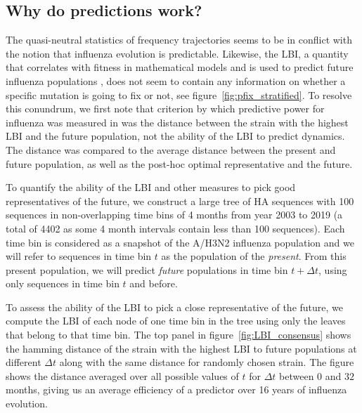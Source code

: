 \documentclass[reprint,amsmath,amssymb,superscriptaddress,showpacs,pre]{revtex4-1}
\begin{document}
\subsection*{Why do predictions work?}
The quasi-neutral statistics of frequency trajectories seems to be in conflict with the notion that influenza evolution is predictable.
Likewise, the LBI, a quantity that correlates with fitness in mathematical models and is used to predict future influenza populations \citep{neher_predicting_2014}, does not seem to contain any information on whether a specific mutation is going to fix or not, see figure~\ref{fig:pfix_stratified}. 
To resolve this conundrum, we first note that criterion by which predictive power for influenza was measured in \citep{neher_predicting_2014} was the distance between the strain with the highest LBI and the future population, not the ability of the LBI to predict dynamics.
The distance was compared to the average distance between the present and future population, as well as the post-hoc optimal representative and the future. 

To quantify the ability of the LBI and other measures to pick good representatives of the future, we construct a large tree of HA sequences with 100 sequences in non-overlapping time bins of 4 months from year 2003 to 2019 (a total of 4402 as some 4 month intervals contain less than 100 sequences).
Each time bin is considered as a snapshot of the A/H3N2 influenza population and we will refer to sequences in time bin $t$ as the population of the \emph{present}. 
From this present population, we will predict \emph{future} populations in time bin $t+\Delta t$, using only sequences in time bin $t$ and before. 

To assess the ability of the LBI to pick a close representative of the future, we compute the LBI of each node of one time bin in the tree using only the leaves that belong to that time bin. 
The top panel in figure~\ref{fig:LBI_consensus} shows the hamming distance of the strain with the highest LBI to future populations at different $\Delta t$ along with the same distance for randomly chosen strain. 
The figure shows the distance averaged over all possible values of $t$ for $\Delta t$ between $0$ and $32$ months, giving us an average efficiency of a predictor over 16 years of influenza evolution. 
\end{document}
